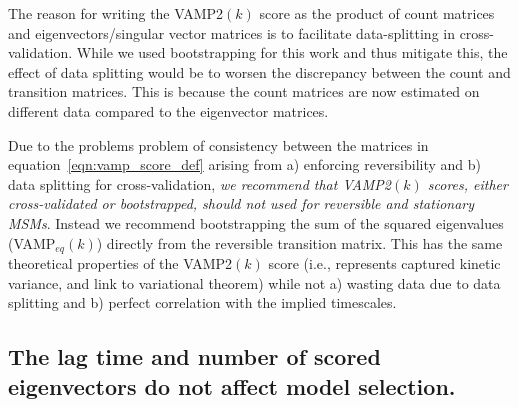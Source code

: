 \documentclass[journal=jacsat,manuscript=article]{achemso}
\begin{document}
The reason for writing the VAMP2$(k)$ score as the product of count matrices and eigenvectors/singular vector matrices is to facilitate data-splitting in cross-validation. While we used bootstrapping for this work and thus mitigate this, the effect of data splitting would be to worsen the discrepancy between the count and transition matrices. This is because the count matrices are now estimated on different data compared to the eigenvector matrices.  

Due to the problems problem of consistency between the matrices in equation~\ref{eqn:vamp_score_def} arising from a) enforcing reversibility and b) data splitting for cross-validation,  \emph{we recommend that VAMP2$(k)$ scores, either cross-validated or bootstrapped, should not used for reversible and stationary MSMs}. Instead we recommend bootstrapping the sum of the squared eigenvalues (VAMP$_{eq}(k)$) directly from the reversible transition matrix. This has the same theoretical properties of the VAMP2$(k)$ score (i.e., represents captured kinetic variance, and link to variational theorem) while not a) wasting data due to data splitting and b) perfect correlation with the implied timescales.

\subsection{The lag time and number of scored eigenvectors do not affect model selection.}
\end{document}
